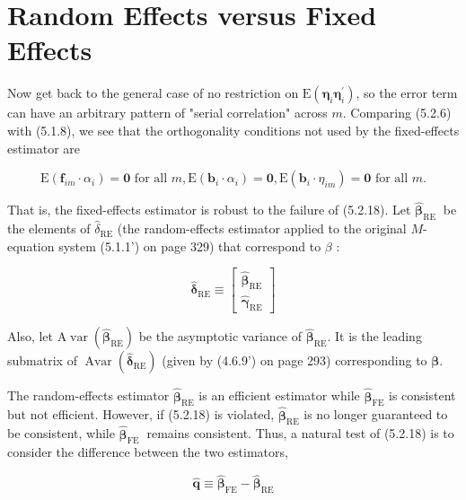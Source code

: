 \documentclass[10pt]{article}
\begin{document}
\section*{Random Effects versus Fixed Effects}
Now get back to the general case of no restriction on $\mathrm{E}\left(\boldsymbol{\eta}_{i} \boldsymbol{\eta}_{i}^{\prime}\right)$, so the error term can have an arbitrary pattern of "serial correlation" across $m$. Comparing (5.2.6) with (5.1.8), we see that the orthogonality conditions not used by the fixed-effects estimator are


\begin{equation*}
\mathrm{E}\left(\mathbf{f}_{i m} \cdot \alpha_{i}\right)=\mathbf{0} \text { for all } m, \mathrm{E}\left(\mathbf{b}_{i} \cdot \alpha_{i}\right)=\mathbf{0}, \mathrm{E}\left(\mathbf{b}_{i} \cdot \eta_{i m}\right)=\mathbf{0} \text { for all } m . \tag{5.2.18}
\end{equation*}


That is, the fixed-effects estimator is robust to the failure of (5.2.18). Let $\widehat{\boldsymbol{\beta}}_{\text {RE }}$ be the elements of $\hat{\delta}_{\mathrm{RE}}$ (the random-effects estimator applied to the original $M$-equation system (5.1.1') on page 329) that correspond to $\beta$ :

\[
\hat{\boldsymbol{\delta}}_{\mathrm{RE}} \equiv\left[\begin{array}{c}
\widehat{\boldsymbol{\beta}}_{\mathrm{RE}}  \tag{5.2.19}\\
\hat{\boldsymbol{\gamma}}_{\mathrm{RE}}
\end{array}\right]
\]

Also, let $\mathrm{A} \operatorname{var}\left(\widehat{\boldsymbol{\beta}}_{\mathrm{RE}}\right)$ be the asymptotic variance of $\widehat{\boldsymbol{\beta}}_{\mathrm{RE}}$. It is the leading submatrix of $\operatorname{Avar}\left(\hat{\boldsymbol{\delta}}_{\mathrm{RE}}\right)$ (given by (4.6.9') on page 293) corresponding to $\boldsymbol{\beta}$.

The random-effects estimator $\widehat{\boldsymbol{\beta}}_{\mathrm{RE}}$ is an efficient estimator while $\widehat{\boldsymbol{\beta}}_{\mathrm{FE}}$ is consistent but not efficient. However, if (5.2.18) is violated, $\widehat{\boldsymbol{\beta}}_{\mathrm{RE}}$ is no longer guaranteed to be consistent, while $\widehat{\boldsymbol{\beta}}_{\text {FE }}$ remains consistent. Thus, a natural test of (5.2.18) is to consider the difference between the two estimators,


\begin{equation*}
\hat{\mathbf{q}} \equiv \widehat{\boldsymbol{\beta}}_{\mathrm{FE}}-\widehat{\boldsymbol{\beta}}_{\mathrm{RE}} \tag{5.2.20}
\end{equation*}
\end{document}

